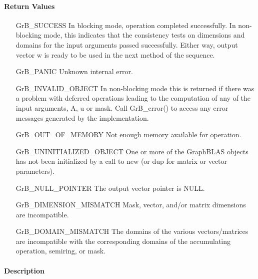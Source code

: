 \paragraph{Return Values}

\begin{itemize}[leftmargin=2.1in]
    \item[{\sf GrB\_SUCCESS}]         In blocking mode, operation
	completed successfully. In non-blocking mode, this indicates
	that the consistency tests on dimensions and domains for the
	input arguments passed successfully. Either way, output vector
	{\sf w} is ready to be used in the next method of the sequence.

    \item[{\sf GrB\_PANIC}]           Unknown internal error.
    
    \item[{\sf GrB\_INVALID\_OBJECT}] In non-blocking mode this is returned if
    there was a problem with deferred operations leading to the computation of
    any of the input arguments, {\sf A}, {\sf u} or {\sf mask}.  Call 
    {GrB\_error()} to access any error messages generated by the implementation.

    \item[{\sf GrB\_OUT\_OF\_MEMORY}]  Not enough memory available for operation.
    
    \item[{\sf GrB\_UNINITIALIZED\_OBJECT}] One or more of the GraphBLAS objects 
    has not been initialized by a call to {\sf new} (or {\sf dup} for matrix or
    vector parameters).
    
    \item[{\sf GrB\_NULL\_POINTER}]  The output vector pointer is {\sf NULL}.
    
    \item[{\sf GrB\_DIMENSION\_MISMATCH}] Mask, vector, and/or matrix 
    dimensions are incompatible.

	\item[{\sf GrB\_DOMAIN\_MISMATCH}]    The domains of the various
	vectors/matrices are incompatible with the corresponding domains of the
	accumulating operation, semiring, or mask.
\end{itemize}

\paragraph{Description}

